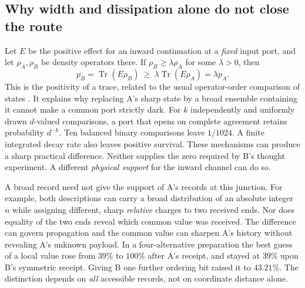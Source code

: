 \documentclass[11pt,a4paper]{article}
\newcommand{\Tr}{\operatorname{Tr}}
\begin{document}
\subsection{Why width and dissipation alone do not close the route}
Let \(E\) be the positive effect for an inward continuation at a \emph{fixed} input port, and let \(\rho_A,\rho_B\) be density operators there. If \(\rho_B\geq\lambda\rho_A\) for some \(\lambda>0\), then
\begin{equation}
 p_B=\Tr(E\rho_B)\ \geq\ \lambda\Tr(E\rho_A)=\lambda p_A .
 \label{eq:floor}
\end{equation}
This is the positivity of a trace, related to the usual operator-order comparison of states \cite{datta}. It explains why replacing A's sharp state by a broad ensemble containing it cannot make a common port strictly dark. For \(k\) independently and uniformly drawn \(d\)-valued comparisons, a port that opens on complete agreement retains probability \(d^{-k}\). Ten balanced binary comparisons leave \(1/1024\). A finite integrated decay rate also leaves positive survival. These mechanisms can produce a sharp practical difference. Neither supplies the zero required by B's thought experiment. A different \emph{physical support} for the inward channel can do so.

A broad record need not give the support of A's records at this junction. For example, both descriptions can carry a broad distribution of an absolute integer \(n\) while assigning different, sharp \emph{relative} charges to two received ends. Nor does equality of the two ends reveal which common value was received. The difference can govern propagation and the common value can sharpen A's history without revealing A's unknown payload. In a four-alternative preparation the best guess of a local value rose from \(39\%\) to \(100\%\) after A's receipt, and stayed at \(39\%\) upon B's symmetric receipt. Giving B one further ordering bit raised it to \(43.21\%\). The distinction depends on \emph{all} accessible records, not on coordinate distance alone.
\end{document}
